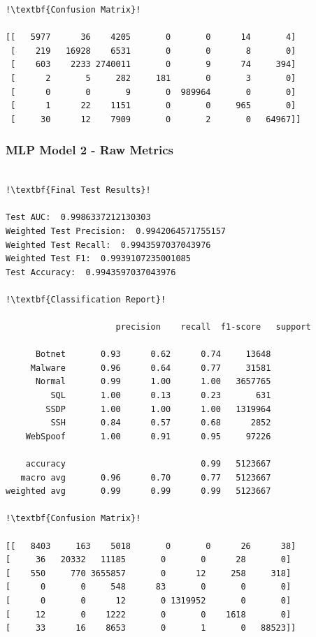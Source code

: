 \begin{appendices}
\begin{lstlisting}[escapechar=!]
!\textbf{Confusion Matrix}!
    
[[   5977      36    4205       0       0      14       4]
 [    219   16928    6531       0       0       8       0]
 [    603    2233 2740011       0       9      74     394]
 [      2       5     282     181       0       3       0]
 [      0       0       9       0  989964       0       0]
 [      1      22    1151       0       0     965       0]
 [     30      12    7909       0       2       0   64967]]

\end{lstlisting}


\subsubsection{MLP Model 2 - Raw Metrics}
\begin{lstlisting}[escapechar=!]

!\textbf{Final Test Results}!

Test AUC:  0.9986337212130303
Weighted Test Precision:  0.9942064571755157
Weighted Test Recall:  0.9943597037043976
Weighted Test F1:  0.9939107235001085
Test Accuracy:  0.9943597037043976

!\textbf{Classification Report}!

			          precision    recall  f1-score   support

      Botnet       0.93      0.62      0.74     13648
     Malware       0.96      0.64      0.77     31581
      Normal       0.99      1.00      1.00   3657765
         SQL       1.00      0.13      0.23       631
        SSDP       1.00      1.00      1.00   1319964
         SSH       0.84      0.57      0.68      2852
    WebSpoof       1.00      0.91      0.95     97226

    accuracy                           0.99   5123667
   macro avg       0.96      0.70      0.77   5123667
weighted avg       0.99      0.99      0.99   5123667
    
!\textbf{Confusion Matrix}!
    
[[   8403     163    5018       0       0      26      38]
[     36   20332   11185       0       0      28       0]
[    550     770 3655857       0      12     258     318]
[      0       0     548      83       0       0       0]
[      0       0      12       0 1319952       0       0]
[     12       0    1222       0       0    1618       0]
[     33      16    8653       0       1       0   88523]]

\end{lstlisting}


\end{appendices}
